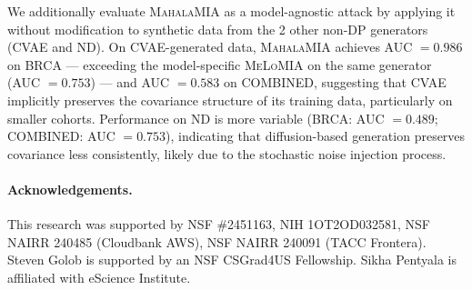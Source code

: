 \documentclass[11pt]{article}
\newcommand{\sikha}[1]{\textcolor{blue}{Sikha: #1}}
\newcommand{\emma}[1]{\textcolor{orange}{Emma: #1}}
\begin{document}
We additionally evaluate \textsc{MahalaMIA} as a model-agnostic attack by applying it without modification to synthetic data from the 2 other non-DP generators (CVAE and ND). On CVAE-generated data, \textsc{MahalaMIA} achieves AUC $= 0.986$ on BRCA --- exceeding the model-specific \textsc{MeLoMIA} on the same generator (AUC $= 0.753$) --- and AUC $= 0.583$ on COMBINED, suggesting that CVAE implicitly preserves the covariance structure of its training data, particularly on smaller cohorts. Performance on ND is more variable (BRCA: AUC $= 0.489$; COMBINED: AUC $= 0.753$), indicating that diffusion-based generation preserves covariance less consistently, likely due to the stochastic noise injection process.






\paragraph{\textbf{Acknowledgements.}}
This research was supported by NSF \#2451163, NIH 1OT2OD032581, NSF NAIRR 
240485 (Cloudbank AWS), NSF NAIRR 240091 (TACC Frontera). Steven Golob is supported by an NSF CSGrad4US Fellowship. Sikha Pentyala is affiliated with eScience Institute.


\end{document}

